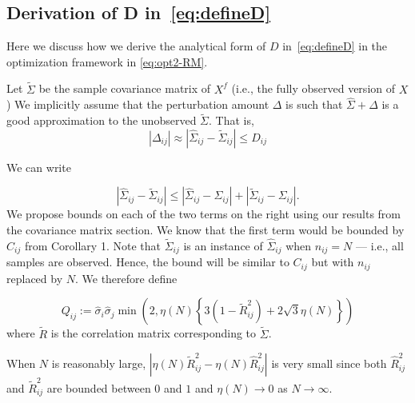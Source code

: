 \subsection*{Derivation of D in~\eqref{eq:defineD}}
Here we discuss how we derive the analytical form of $D$ in~\eqref{eq:defineD} in the optimization framework in \eqref{eq:opt2-RM}. 

Let $\tilde{\Sigma}$ be the sample covariance matrix of 
$X^f$ (i.e., the fully observed version of $X$)
We implicitly assume that the perturbation amount $\Delta$ is such that 
$\hat{\Sigma} + \Delta$ is a good approximation to the unobserved $\tilde{\Sigma}$.
That is, 
\begin{equation}\label{eq:Delta_explain}
   |\Delta_{ij}| \approx | \hat{\Sigma}_{ij} - \tilde{\Sigma}_{ij} | \leq D_{ij}
\end{equation}

We can write

\begin{equation}\label{eq:Delta_ineq1}
| \hat{\Sigma}_{ij} - \tilde{\Sigma}_{ij} |  \leq | \hat{\Sigma}_{ij} - \Sigma_{ij} | + |\tilde{\Sigma}_{ij} - \Sigma_{ij} | .
\end{equation}
We propose bounds on each of the two terms on the right using our results from the \Robocov{} covariance matrix section. We know that the first term would be bounded by $C_{ij}$ from Corollary 1. Note that $\tilde{\Sigma}_{ij}$ is an instance of 
$\hat{\Sigma}_{ij}$ when $n_{ij} = N$ --- i.e., all samples are observed. Hence, the bound will be similar to $C_{ij}$ but with $n_{ij}$ replaced by $N$. We therefore define 

\begin{equation}\label{eq:defineQ}
Q_{ij} := \hat{\sigma}_{i} \hat{\sigma}_{j} \min \left (2,  \eta (N) \left \{ 3 (1 - {\tilde{R}}^2_{ij}) + 2 \sqrt{3} \eta (N) \right \} \right )
\end{equation}
where ${\tilde{R}}$ is the correlation matrix corresponding to $\tilde{\Sigma}$. 

When $N$ is reasonably large, $|\eta(N)\tilde{R}^2_{ij} - \eta(N){\hat{R}}^2_{ij}|$ is very small since both $\hat{R}^2_{ij}$ and $\tilde{R}_{ij}^2$ are bounded between $0$ and $1$ and $\eta(N) \rightarrow 0$ as $N \rightarrow \infty$.

